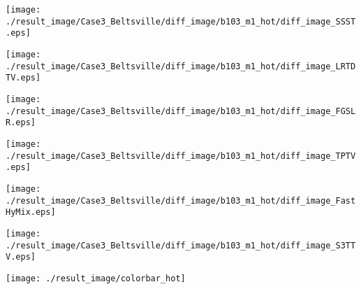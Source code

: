 \begin{figure*}[t]
\begin{center}
		\begin{minipage}{0.125\hsize}
			\centerline{\hspace{\hsize}} %
		\end{minipage}
		\begin{minipage}{0.125\hsize}
			\centerline{\texttt{[image: ./result\_image/Case3\_Beltsville/diff\_image/b103\_m1\_hot/diff\_image\_SSST.eps]}} %
		\end{minipage}
		\begin{minipage}{0.125\hsize}
			\centerline{\texttt{[image: ./result\_image/Case3\_Beltsville/diff\_image/b103\_m1\_hot/diff\_image\_LRTDTV.eps]}} %
		\end{minipage}
		\begin{minipage}{0.125\hsize}
			\centerline{\texttt{[image: ./result\_image/Case3\_Beltsville/diff\_image/b103\_m1\_hot/diff\_image\_FGSLR.eps]}} %
		\end{minipage}
		\begin{minipage}{0.125\hsize}
			\centerline{\texttt{[image: ./result\_image/Case3\_Beltsville/diff\_image/b103\_m1\_hot/diff\_image\_TPTV.eps]}} %
		\end{minipage}
		\begin{minipage}{0.125\hsize}
			\centerline{\texttt{[image: ./result\_image/Case3\_Beltsville/diff\_image/b103\_m1\_hot/diff\_image\_FastHyMix.eps]}} %
		\end{minipage}
		\begin{minipage}{0.125\hsize}
			\centerline{\texttt{[image: ./result\_image/Case3\_Beltsville/diff\_image/b103\_m1\_hot/diff\_image\_S3TTV.eps]}} %
		\end{minipage}
		\begin{minipage}{0.050\hsize}
			\centerline{\texttt{[image: ./result\_image/colorbar\_hot]}} %
		\end{minipage}
		
		\vspace{1mm}
		

\end{center}
\end{figure*}
